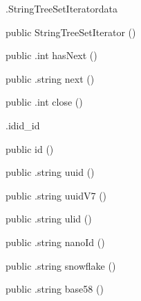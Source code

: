 \begin{CrexxClass}{.StringTreeSetIterator}{data}

  \begin{Hierarchy}
  \end{Hierarchy}

  \begin{Members}

    \Factory
      {public}
      {StringTreeSetIterator}
      {()}

    \Method
      {public}
      {.int}
      {hasNext}
      {()}

    \Method
      {public}
      {.string}
      {next}
      {()}

    \Method
      {public}
      {.int}
      {close}
      {()}

  \end{Members}
\end{CrexxClass}

\begin{CrexxClass}{.id}{id\_id}

  \begin{Hierarchy}
  \end{Hierarchy}

  \begin{Members}

    \Factory
      {public}
      {id}
      {()}

    \Method
      {public}
      {.string}
      {uuid}
      {()}

    \Method
      {public}
      {.string}
      {uuidV7}
      {()}

    \Method
      {public}
      {.string}
      {ulid}
      {()}

    \Method
      {public}
      {.string}
      {nanoId}
      {()}

    \Method
      {public}
      {.string}
      {snowflake}
      {()}

    \Method
      {public}
      {.string}
      {base58}
      {()}

  \end{Members}
\end{CrexxClass}

